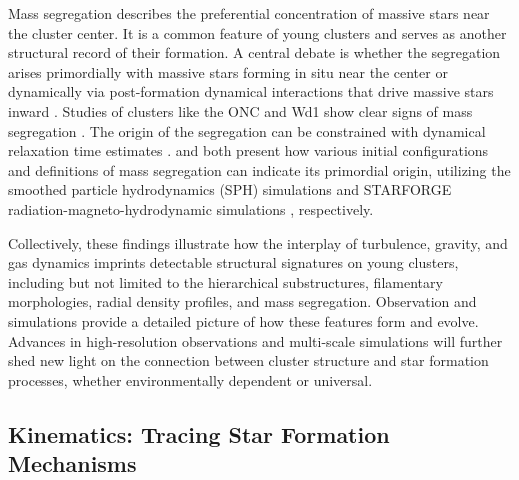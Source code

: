 \documentclass[12pt]{ucsddissertation}
\begin{document}
\begin{CJK*}{UTF8}{gbsn}
Mass segregation describes the preferential concentration of massive stars near the cluster center. It is a common feature of young clusters and serves as another structural record of their formation. A central debate is whether the segregation arises primordially with massive stars forming in situ near the center or dynamically via post-formation dynamical interactions that drive massive stars inward \citep[][]{Bonnell-1998, Parker-2016}. Studies of clusters like the ONC and Wd1 show clear signs of mass segregation \citep[][]{Hillenbrand-1998, Gennaro-2011, Wei-2024}. The origin of the segregation can be constrained with dynamical relaxation time estimates \citep[e.g.,][]{Bonnell-1998, Wei-2025}. \citet{Parker-2015a} and \citet{Guszejnov-2022} both present how various initial configurations and definitions of mass segregation can indicate its primordial origin, utilizing the smoothed particle hydrodynamics (SPH) simulations and STARFORGE radiation-magneto-hydrodynamic simulations \citep[][]{Grudic-2021, Grudic-2024}, respectively.

Collectively, these findings illustrate how the interplay of turbulence, gravity, and gas dynamics imprints detectable structural signatures on young clusters, including but not limited to the hierarchical substructures, filamentary morphologies, radial density profiles, and mass segregation. Observation and simulations provide a detailed picture of how these features form and evolve. Advances in high-resolution observations and multi-scale simulations will further shed new light on the connection between cluster structure and star formation processes, whether environmentally dependent or universal.


%
%
\subsection*{Kinematics: Tracing Star Formation Mechanisms}%


\end{CJK*}
\end{document}

